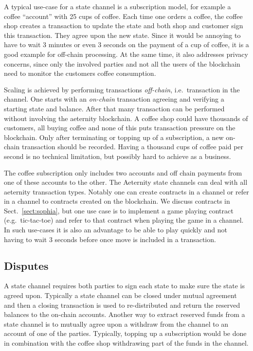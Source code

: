 A typical use-case for a state channel is a subscription model, for
example a coffee ``account'' with 25 cups of coffee. Each time one
orders a coffee, the coffee shop
creates a transaction to update the state and both shop
and customer sign this transaction. They agree upon the new state.
Since it would be annoying to have to wait 3 minutes or even 3 seconds
on the payment of a cup of coffee, it is a good example for off-chain
processing. At the same time, it also addresses privacy concerns,
since only the involved parties and not all the users of the
blockchain need to monitor the customers coffee consumption.

Scaling is achieved by performing transactions \textit{off-chain},
i.e.\ transaction in the channel. One starts with an \textit{on-chain}
transaction agreeing and verifying a starting state and balance. After
that many transaction can be performed without involving the aeternity
blockchain. A coffee shop could have thousands of customers, all buying coffee and none of
this puts transaction pressure on the blockchain. Only after
terminating or topping up of a subscription, a new on-chain
transaction should be recorded. Having a thousand cups of coffee paid
per second is no technical limitation, but possibly hard to achieve as
a business.

The coffee subscription only includes two accounts and off chain
payments from one of these accounts to the other. The Aeternity state
channels can deal with all aeternity transaction types. Notably one
can create contracts in a channel or refer in a channel to contracts
created on the blockchain. We discuss contracts in Sect.\
\ref{sect:sophia}, but one use case is to implement a game playing
contract (e.g.\ tic-tac-toe) and refer to that contract when playing the
game in a channel. In such use-cases it is also an advantage to be
able to play quickly and not having to wait 3 seconds before once move
is included in a transaction.

\subsection{Disputes}

A state channel requires both parties to sign each state to make
sure the state is agreed upon. Typically a state channel can be closed
under mutual agreement and then a closing transaction is used to
re-distributed and return the reserved balances to the on-chain
accounts. Another way to extract reserved funds from a state channel
is to mutually agree upon a withdraw from the channel to an account of
one of the parties. Typically, topping up a subscription would be done
in combination with the coffee shop withdrawing part of the funds in
the channel.

